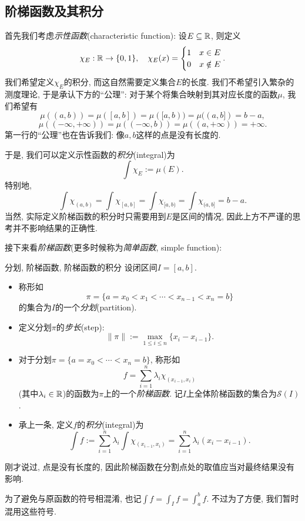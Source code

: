 \subsection{阶梯函数及其积分}

首先我们考虑\textit{示性函数}(characteristic function): 设$E \subseteq \mathbb{R}$, 则定义$$\chi _{E}:\mathbb{R} \to \{ 0,1 \},\quad \chi _{E} (x) = \begin{cases}
	1 & x \in E \\ 0 & x \notin E
\end{cases}.$$
我们希望定义$\chi _E$的积分, 而这自然需要定义集合$E$的长度. 我们不希望引入繁杂的测度理论, 于是承认下方的“公理”: 对于某个将集合映射到其对应长度的函数$\mu$, 我们希望有$$\mu ((a,b)) = \mu ([a,b]) = \mu ([a,b)) = \mu ((a,b]) = b-a, $$
$$\mu ((-\infty ,+\infty)) = \mu ((-\infty ,b)) = \mu ((a ,+\infty)) = +\infty .$$
第一行的“公理”也在告诉我们: 像$a,b$这样的点是没有长度的. 

于是, 我们可以定义示性函数的\textit{积分}(integral)为$$\int \chi _E := \mu (E). $$
特别地, $$\int \chi _{(a,b)} = \int \chi _{[a,b]} = \int \chi _{[a,b)} = \int \chi _{(a,b]} = b-a. $$
当然, 实际定义阶梯函数的积分时只需要用到$E$是区间的情况, 因此上方不严谨的思考并不影响结果的正确性. 

接下来看\textit{阶梯函数}(更多时候称为\textit{简单函数}, simple function): 

\begin{definition}{分划, 阶梯函数, 阶梯函数的积分}
	设闭区间$I=[a,b]$. 
	\begin{itemize}
		\item 称形如$$\pi = \{ a=x_0<x_1<\cdots <x_{n-1}<x_n=b \}$$
		的集合为$I$的一个\textit{分划}(partition). 
		\item 定义分划$\pi$的\textit{步长}(step): $$\| \pi \| := \max_{1 \leq i \leq n} \{ x_i-x_{i-1} \}. $$
		\item 对于分划$\pi= \{ a=x_0<\cdots <x_n=b \}$, 称形如$$f = \sum_{i=1}^{n} \lambda _i \chi _{(x_{i-1},x_{i})} $$
		(其中$\lambda _i \in \mathbb{R}$)的函数为$\pi$上的一个\textit{阶梯函数}. 记$I$上全体阶梯函数的集合为$\mathcal{S}(I)$. 
		\item 承上一条, 定义$f$的\textit{积分}(integral)为$$\int f := \sum_{i=1}^{n} \lambda _i \int \chi _{(x_{i-1},x_i)} = \sum_{i=1}^{n} \lambda _i (x_i-x_{i-1}). $$
	\end{itemize}
\end{definition}
\begin{remark}
	刚才说过, 点是没有长度的, 因此阶梯函数在分割点处的取值应当对最终结果没有影响. 
\end{remark}
\begin{remark}
	为了避免与原函数的符号相混淆, 也记$\int f = \int _I f = \int_a^b f$. 不过为了方便, 我们暂时混用这些符号. 
\end{remark}

